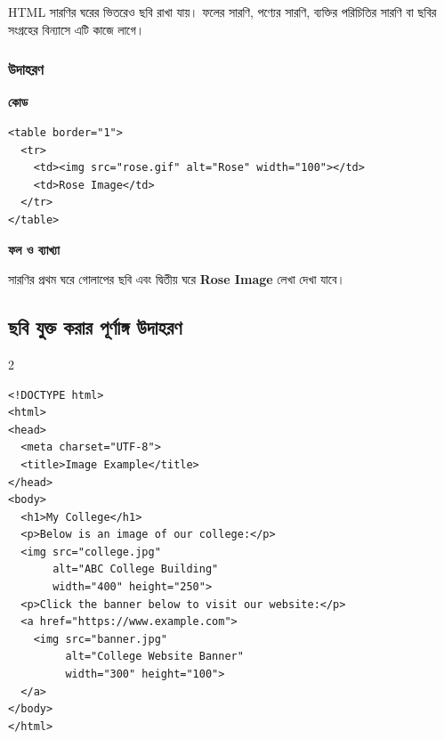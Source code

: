 HTML সারণির ঘরের ভিতরেও ছবি রাখা যায়। ফলের সারণি, পণ্যের সারণি, ব্যক্তির পরিচিতির সারণি বা ছবির সংগ্রহের বিন্যাসে এটি কাজে লাগে।

\subsubsection{উদাহরণ}

\par\noindent
\begin{minipage}[t]{.54\linewidth}\vspace{0pt}\small
\textbf{\color{chFourTeal}কোড}\par
\begin{verbatim}
<table border="1">
  <tr>
    <td><img src="rose.gif" alt="Rose" width="100"></td>
    <td>Rose Image</td>
  </tr>
</table>
\end{verbatim}

\par\smallskip
\end{minipage}\hfill
\begin{minipage}[t]{.42\linewidth}\vspace{0pt}\small
\textbf{\color{chFourTeal}ফল ও ব্যাখ্যা}\par
সারণির প্রথম ঘরে গোলাপের ছবি এবং দ্বিতীয় ঘরে \textbf{Rose Image} লেখা দেখা যাবে।
\par\smallskip
\end{minipage}\par


\subsection{ছবি যুক্ত করার পূর্ণাঙ্গ উদাহরণ}

\par{}\par
\begin{multicols}{2}
\begin{verbatim}
<!DOCTYPE html>
<html>
<head>
  <meta charset="UTF-8">
  <title>Image Example</title>
</head>
<body>
  <h1>My College</h1>
  <p>Below is an image of our college:</p>
  <img src="college.jpg"
       alt="ABC College Building"
       width="400" height="250">
  <p>Click the banner below to visit our website:</p>
  <a href="https://www.example.com">
    <img src="banner.jpg"
         alt="College Website Banner"
         width="300" height="100">
  </a>
</body>
</html>
\end{verbatim}
\end{multicols}


